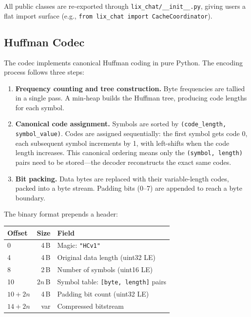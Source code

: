 \documentclass[conference]{IEEEtran}
\begin{document}
All public classes are re-exported through \texttt{lix\_chat/\_\_init\_\_.py}, giving users a flat import surface (e.g., \texttt{from lix\_chat import CacheCoordinator}).

\subsection{Huffman Codec}

The codec implements canonical Huffman coding in pure Python. The encoding process follows three steps:

\begin{enumerate}
\item \textbf{Frequency counting and tree construction.} Byte frequencies are tallied in a single pass. A min-heap builds the Huffman tree, producing code lengths for each symbol.

\item \textbf{Canonical code assignment.} Symbols are sorted by \texttt{(code\_length, symbol\_value)}. Codes are assigned sequentially: the first symbol gets code 0, each subsequent symbol increments by 1, with left-shifts when the code length increases. This canonical ordering means only the \texttt{(symbol, length)} pairs need to be stored---the decoder reconstructs the exact same codes.

\item \textbf{Bit packing.} Data bytes are replaced with their variable-length codes, packed into a byte stream. Padding bits (0--7) are appended to reach a byte boundary.
\end{enumerate}

The binary format prepends a header:

\begin{center}
\begin{tabular}{lrl}
\toprule
\textbf{Offset} & \textbf{Size} & \textbf{Field} \\
\midrule
0 & 4\,B & Magic: \texttt{"HCv1"} \\
4 & 4\,B & Original data length (uint32 LE) \\
8 & 2\,B & Number of symbols (uint16 LE) \\
10 & $2n$\,B & Symbol table: \texttt{[byte, length]} pairs \\
$10{+}2n$ & 4\,B & Padding bit count (uint32 LE) \\
$14{+}2n$ & var & Compressed bitstream \\
\bottomrule
\end{tabular}
\end{center}
\end{document}
